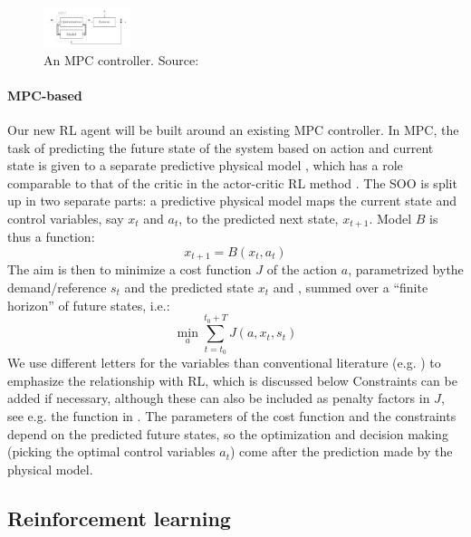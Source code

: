 \documentclass{article}
\theoremstyle{definition}
\theoremstyle{remark}
\begin{document}
\FloatBarrier
\begin{figure}
    \centering
    \includegraphics[width=1in]{mpc.png}
    \caption{An MPC controller. Source: \cite{Schwenzer_Ay_Bergs_Abel_2021}}
    \label{fig:my_label}
\end{figure}

\paragraph{MPC-based}
Our new RL agent will be built around an existing MPC controller. In MPC, the task of predicting the future state of the system based on action and current state is given to a separate predictive physical model \cite{privara2011modeling}, which has a role comparable to that of the critic in the actor-critic RL method \cite{suttonbarto2018, Szepesvari2010}. The SOO is split up in two separate parts: a predictive physical model maps the current state and control variables, say $x_t$ and $a_t$, to the predicted next state, $x_{t+1}$. Model $B$ is thus a function:
\begin{equation}
    x_{t+1} = B(x_t,a_t)
\end{equation}
The aim is then to minimize a cost function $J$ of the action $a$, parametrized bythe demand/reference $s_t$ and the predicted state $x_t$ and , summed over a ``finite horizon'' of future states, i.e.:
\begin{equation}
    \min_a \sum_{t=t_0}^{t_0+T}J(a, x_t, s_t)
\end{equation}
We use different letters for the variables than conventional literature (e.g. \cite{Schwenzer_Ay_Bergs_Abel_2021}) to emphasize the relationship with RL, which is discussed below
Constraints can be added if necessary, although these can also be included as penalty factors in $J$, see e.g. the function in \cite{privara2011modeling}. The parameters of the cost function and the constraints depend on the predicted future states, so the optimization and decision making (picking the optimal control variables $a_t$) come after the prediction made by the physical model. 


\FloatBarrier
\subsection{Reinforcement learning}
\end{document}
